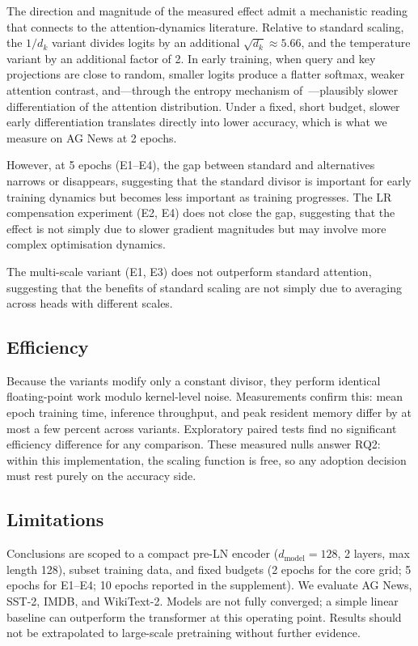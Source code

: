 \documentclass[10pt,a4paper]{article}
\begin{document}
The direction and magnitude of the measured effect admit a mechanistic reading that connects to the attention-dynamics literature. Relative to standard scaling, the $1/d_k$ variant divides logits by an additional $\sqrt{d_k} \approx 5.66$, and the temperature variant by an additional factor of 2. In early training, when query and key projections are close to random, smaller logits produce a flatter softmax, weaker attention contrast, and---through the entropy mechanism of~\cite{zhai2023}---plausibly slower differentiation of the attention distribution. Under a fixed, short budget, slower early differentiation translates directly into lower accuracy, which is what we measure on AG News at 2 epochs.

However, at 5 epochs (E1--E4), the gap between standard and alternatives narrows or disappears, suggesting that the standard divisor is important for early training dynamics but becomes less important as training progresses. The LR compensation experiment (E2, E4) does not close the gap, suggesting that the effect is not simply due to slower gradient magnitudes but may involve more complex optimisation dynamics.

The multi-scale variant (E1, E3) does not outperform standard attention, suggesting that the benefits of standard scaling are not simply due to averaging across heads with different scales.

\subsection{Efficiency}

Because the variants modify only a constant divisor, they perform identical floating-point work modulo kernel-level noise. Measurements confirm this: mean epoch training time, inference throughput, and peak resident memory differ by at most a few percent across variants. Exploratory paired tests find no significant efficiency difference for any comparison. These measured nulls answer RQ2: within this implementation, the scaling function is free, so any adoption decision must rest purely on the accuracy side.

\subsection{Limitations}

Conclusions are scoped to a compact pre-LN encoder ($d_{\text{model}}=128$, 2 layers, max length 128), subset training data, and fixed budgets (2 epochs for the core grid; 5 epochs for E1--E4; 10 epochs reported in the supplement). We evaluate AG News, SST-2, IMDB, and WikiText-2. Models are not fully converged; a simple linear baseline can outperform the transformer at this operating point. Results should not be extrapolated to large-scale pretraining without further evidence.
\end{document}
